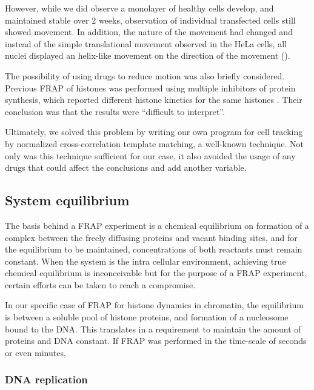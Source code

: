     However, while we did observe a monolayer of healthy cells develop,
    and maintained stable over 2 weeks, observation of individual transfected
    cells still showed movement. In addition, the nature of the movement
    had changed and instead of the simple translational movement observed
    in the HeLa cells, all nuclei displayed an helix-like movement on the
    direction of the movement ().

    The possibility of using drugs to reduce motion was also briefly
    considered. Previous FRAP of histones was performed using
    multiple inhibitors of protein synthesis, which reported different
    histone kinetics for the same histones \citep{KimuraCook}. Their
    conclusion was that the results were ``difficult to interpret''.

    Ultimately, we solved this problem by writing our own program
    for cell tracking by normalized cross-correlation template matching, a
    well-known technique. Not only was this technique sufficient for our
    case, it also avoided the usage of any drugs that could affect the
    conclusions and add another variable.


  \subsection{System equilibrium}

    The basis behind a FRAP experiment is a chemical equilibrium on
    formation of a complex between the freely diffusing proteins and
    vacant binding sites, and for the equilibrium to be maintained,
    concentrations of both reactants must remain constant.
    When the system is the intra cellular environment, achieving
    true chemical equilibrium is inconceivable but for the purpose
    of a FRAP experiment, certain efforts can be taken to reach a
    compromise.

    In our specific case of FRAP for histone
    dynamics in chromatin, the equilibrium is between
    a soluble pool of histone proteins, and formation of a nucleosome
    bound to the DNA. This translates in a requirement to maintain the
    amount of proteins and DNA constant. If FRAP was performed in the
    time-scale of seconds or even minutes, 

    \subsubsection{DNA replication}

